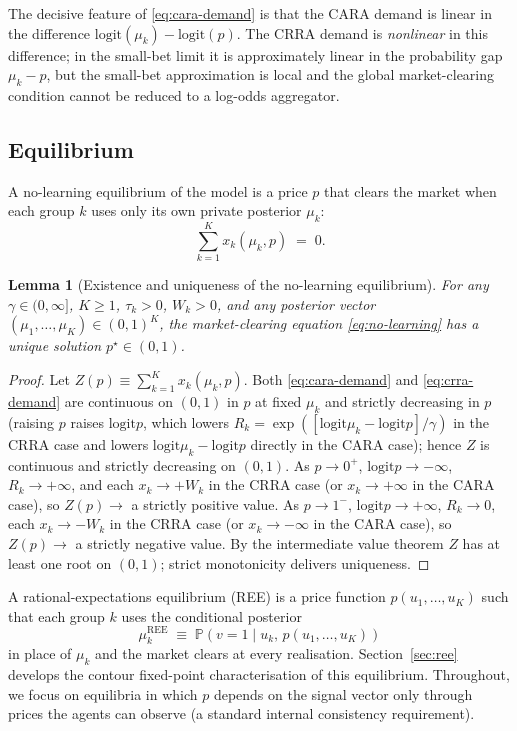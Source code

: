 \documentclass[12pt,letterpaper]{article}
\newtheorem{lemma}{Lemma}
\theoremstyle{definition}
\theoremstyle{remark}
\newcommand{\PP}{\mathbb{P}}
\newcommand{\logit}{\mathrm{logit}}
\newcommand{\1}{\mathbf{1}}
\begin{document}
The decisive feature of \eqref{eq:cara-demand} is that the CARA demand is
linear in the difference $\logit(\mu_{k})-\logit(p)$. The CRRA demand is
\emph{nonlinear} in this difference; in the small-bet limit it is
approximately linear in the probability gap $\mu_{k}-p$, but the small-bet
approximation is local and the global market-clearing condition cannot be
reduced to a log-odds aggregator.

\subsection{Equilibrium}

A no-learning equilibrium of the model is a price $p$ that clears the market
when each group $k$ uses only its own private posterior $\mu_{k}$:
\begin{equation}
   \sum_{k=1}^{K} x_{k}\!\left(\mu_{k},p\right) \;=\; 0.
\label{eq:no-learning}
\end{equation}

\begin{lemma}[Existence and uniqueness of the no-learning
equilibrium]\label{lem:existence}
For any $\gamma\in(0,\infty]$, $K\geq 1$, $\tau_{k}>0$, $W_{k}>0$, and any
posterior vector $(\mu_{1},\ldots,\mu_{K})\in(0,1)^{K}$, the
market-clearing equation \eqref{eq:no-learning} has a unique solution
$p^{\star}\in(0,1)$.
\end{lemma}

\begin{proof}
Let $Z(p)\equiv\sum_{k=1}^{K}x_{k}(\mu_{k},p)$. Both \eqref{eq:cara-demand}
and \eqref{eq:crra-demand} are continuous on $(0,1)$ in $p$ at fixed
$\mu_{k}$ and strictly decreasing in $p$ (raising $p$ raises $\logit p$,
which lowers $R_{k}=\exp([\logit\mu_{k}-\logit p]/\gamma)$ in the CRRA
case and lowers $\logit\mu_{k}-\logit p$ directly in the CARA case);
hence $Z$ is continuous and strictly decreasing on $(0,1)$. As
$p\to 0^{+}$, $\logit p\to-\infty$, $R_{k}\to+\infty$, and each
$x_{k}\to+W_{k}$ in the CRRA case (or $x_{k}\to+\infty$ in the CARA case),
so $Z(p)\to$ a strictly positive value. As $p\to 1^{-}$, $\logit p\to+\infty$,
$R_{k}\to 0$, each $x_{k}\to-W_{k}$ in the CRRA case (or
$x_{k}\to-\infty$ in the CARA case), so $Z(p)\to$ a strictly negative
value. By the intermediate value theorem $Z$ has at least one root on
$(0,1)$; strict monotonicity delivers uniqueness.
\end{proof}

A rational-expectations equilibrium (REE) is a price function $p(u_{1},
\ldots,u_{K})$ such that each group $k$ uses the conditional posterior
\begin{equation}
   \mu_{k}^{\mathrm{REE}} \;\equiv\; \PP\!\left(v=1\mid u_{k},\,p(u_{1},\ldots,u_{K})\right)
\label{eq:ree-posterior}
\end{equation}
in place of $\mu_{k}$ and the market clears at every realisation.
Section~\ref{sec:ree} develops the contour fixed-point characterisation of
this equilibrium. Throughout, we focus on equilibria in which $p$ depends on
the signal vector only through prices the agents can observe (a standard
internal consistency requirement).
\end{document}
